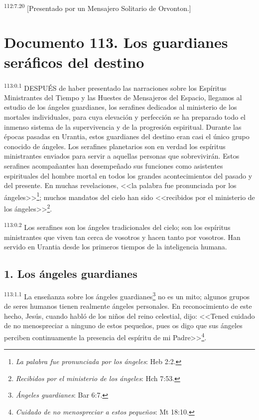 \documentclass[twoside, 11pt]{book}
\begin{document}
\par
\textsuperscript{112:7.20} [Presentado por un Mensajero Solitario de Orvonton.]


\chapter{Documento 113. Los guardianes seráficos del destino}
\par
\textsuperscript{113:0.1} DESPUÉS de haber presentado las narraciones sobre los Espíritus Ministrantes del Tiempo y las Huestes de Mensajeros del Espacio, llegamos al estudio de los ángeles guardianes, los serafines dedicados al ministerio de los mortales individuales, para cuya elevación y perfección se ha preparado todo el inmenso sistema de la supervivencia y de la progresión espiritual. Durante las épocas pasadas en Urantia, estos guardianes del destino eran casi el único grupo conocido de ángeles. Los serafines planetarios son en verdad los espíritus ministrantes enviados para servir a aquellas personas que sobrevivirán. Estos serafines acompañantes han desempeñado sus funciones como asistentes espirituales del hombre mortal en todos los grandes acontecimientos del pasado y del presente. En muchas revelaciones, <<la palabra fue pronunciada por los ángeles>>\footnote{\textit{La palabra fue pronunciada por los ángeles}: Heb 2:2.}; muchos mandatos del cielo han sido <<recibidos por el ministerio de los ángeles>>\footnote{\textit{Recibidos por el ministerio de los ángeles}: Hch 7:53.}.

\par
\textsuperscript{113:0.2} Los serafines son los ángeles tradicionales del cielo; son los espíritus ministrantes que viven tan cerca de vosotros y hacen tanto por vosotros. Han servido en Urantia desde los primeros tiempos de la inteligencia humana.

\section*{1. Los ángeles guardianes}
\par
\textsuperscript{113:1.1} La enseñanza sobre los ángeles guardianes\footnote{\textit{Ángeles guardianes}: Bar 6:7.} no es un mito; algunos grupos de seres humanos tienen realmente ángeles personales. En reconocimiento de este hecho, Jesús, cuando habló de los niños del reino celestial, dijo: <<Tened cuidado de no menospreciar a ninguno de estos pequeños, pues os digo que sus ángeles perciben continuamente la presencia del espíritu de mi Padre>>\footnote{\textit{Cuidado de no menospreciar a estos pequeños}: Mt 18:10.}.
\end{document}

